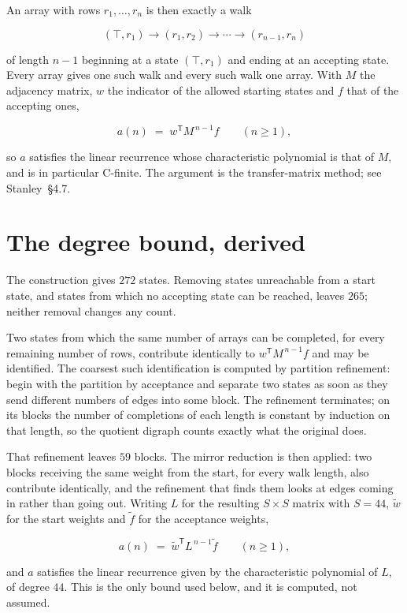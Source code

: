 \documentclass[11pt]{article}
\theoremstyle{definition}
\begin{document}
An array with rows $r_1,\dots,r_n$ is then exactly a walk

\[(\top,r_1) \to (r_1,r_2) \to \cdots \to (r_{n-1},r_n)\]

of length $n-1$ beginning at a state $(\top,r_1)$ and ending at an accepting state. Every array gives one such walk and every such walk one array. With $M$ the adjacency matrix, $w$ the indicator of the allowed starting states and $f$ that of the accepting ones,

\[a(n) \;=\; w^{\mathsf T} M^{\,n-1} f \qquad (n \ge 1),\]

so $a$ satisfies the linear recurrence whose characteristic polynomial is that of $M$, and is in particular C-finite. The argument is the transfer-matrix method; see Stanley~\S4.7.

\section{The degree bound, derived}

The construction gives $272$ states. Removing states unreachable from a start state, and states from which no accepting state can be reached, leaves $265$; neither removal changes any count.

Two states from which the same number of arrays can be completed, for every remaining number of rows, contribute identically to $w^{\mathsf T}M^{\,n-1}f$ and may be identified. The coarsest such identification is computed by partition refinement: begin with the partition by acceptance and separate two states as soon as they send different numbers of edges into some block. The refinement terminates; on its blocks the number of completions of each length is constant by induction on that length, so the quotient digraph counts exactly what the original does.

That refinement leaves $59$ blocks. The mirror reduction is then applied: two blocks receiving the same weight from the start, for every walk length, also contribute identically, and the refinement that finds them looks at edges coming in rather than going out. Writing $L$ for the resulting $S \times S$ matrix with $S = 44$, $\tilde w$ for the start weights and $\tilde f$ for the acceptance weights,

\[a(n) \;=\; \tilde w^{\mathsf T} L^{\,n-1} \tilde f \qquad (n \ge 1),\]

and $a$ satisfies the linear recurrence given by the characteristic polynomial of $L$, of degree $44$. This is the only bound used below, and it is computed, not assumed.
\end{document}
